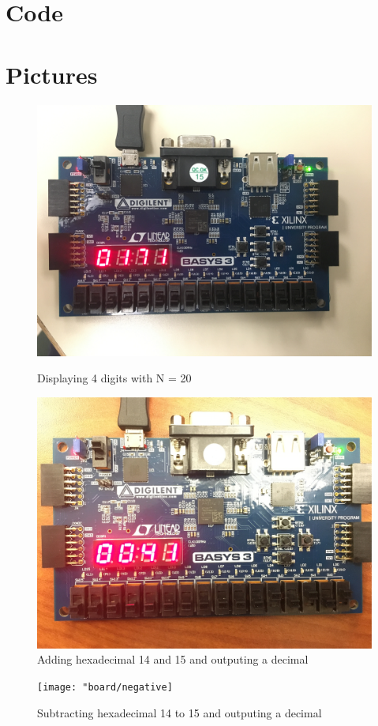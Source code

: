 \documentclass[11pt]{article}
\newcommand{\Verilog}[2][]{%
	
}
\begin{document}
\section*{Code}
\Verilog[firstline=23,caption=Counter Implementation]{../verilog_code/counter.sv}
\Verilog[firstline=23,caption=Counter Test Bench]{../verilog_code/counter_test.sv}
\Verilog[firstline=23,caption=show\_2c Implementation]{../verilog_code/show_2c.sv}
\Verilog[firstline=23,caption=show\_2c Test Bench]{../verilog_code/show_2c_test.sv}
\Verilog[firstline=23,caption=Wrapper Implementation]{../verilog_code/wrapper.sv}
\Verilog[firstline=23,caption=Top-Level Implementation]{../verilog_code/calc_lab10.sv}


\section*{Pictures}
\begin{figure}[ht]
	\centering
	\includegraphics[width=12cm]{"board/4digit"}
	\caption{Displaying 4 digits with N = 20}
	\includegraphics[width=12cm]{"board/positive"}
	\caption{Adding hexadecimal 14 and 15 and outputing a decimal}
\end{figure}
\begin{figure}[ht]
	\centering
	\texttt{[image: "board/negative]}
	\caption{Subtracting hexadecimal 14 to 15 and outputing a decimal}
\end{figure}
\end{document}

